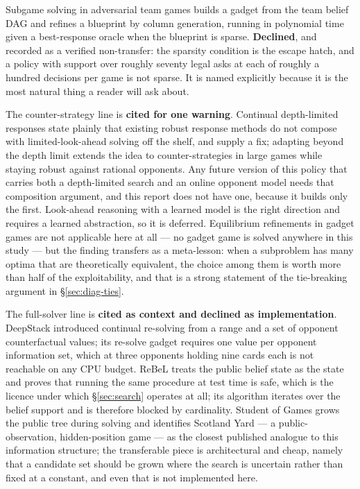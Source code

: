 Subgame solving in adversarial team games \cite{zhang2022teamsubgame} builds a
gadget from the team belief DAG and refines a blueprint by column generation,
running in polynomial time given a best-response oracle when the blueprint is
sparse. \textbf{Declined}, and recorded as a verified non-transfer: the sparsity
condition is the escape hatch, and a policy with support over roughly seventy
legal asks at each of roughly a hundred decisions per game is not sparse. It is
named explicitly because it is the most natural thing a reader will ask about.

The counter-strategy line is \textbf{cited for one warning}. Continual
depth-limited responses \cite{milec2021cdr} state plainly that existing robust
response methods do not compose with limited-look-ahead solving off the shelf,
and supply a fix; adapting beyond the depth limit \cite{milec2025abd} extends
the idea to counter-strategies in large games while staying robust against
rational opponents. Any future version of this policy that carries both a
depth-limited search and an online opponent model needs that composition
argument, and this report does not have one, because it builds only the first.
Look-ahead reasoning with a learned model \cite{kubicek2025lamir} is the right
direction and requires a learned abstraction, so it is deferred. Equilibrium
refinements in gadget games \cite{kubicek2026refinements} are not applicable
here at all --- no gadget game is solved anywhere in this study --- but the
finding transfers as a meta-lesson: when a subproblem has many optima that are
theoretically equivalent, the choice among them is worth more than half of the
exploitability, and that is a strong statement of the tie-breaking argument in
\S\ref{sec:diag-ties}.

The full-solver line is \textbf{cited as context and declined as
implementation}. DeepStack \cite{moravcik2017deepstack} introduced continual
re-solving from a range and a set of opponent counterfactual values; its
re-solve gadget requires one value per opponent information set, which at three
opponents holding nine cards each is not reachable on any CPU budget. ReBeL
\cite{brown2020rebel} treats the public belief state as the state and proves
that running the same procedure at test time is safe, which is the licence under
which \S\ref{sec:search} operates at all; its algorithm iterates over the belief
support and is therefore blocked by cardinality. Student of Games
\cite{schmid2023sog} grows the public tree during solving and identifies
Scotland Yard --- a public-observation, hidden-position game --- as the closest
published analogue to this information structure; the transferable piece is
architectural and cheap, namely that a candidate set should be grown where the
search is uncertain rather than fixed at a constant, and even that is not
implemented here.

